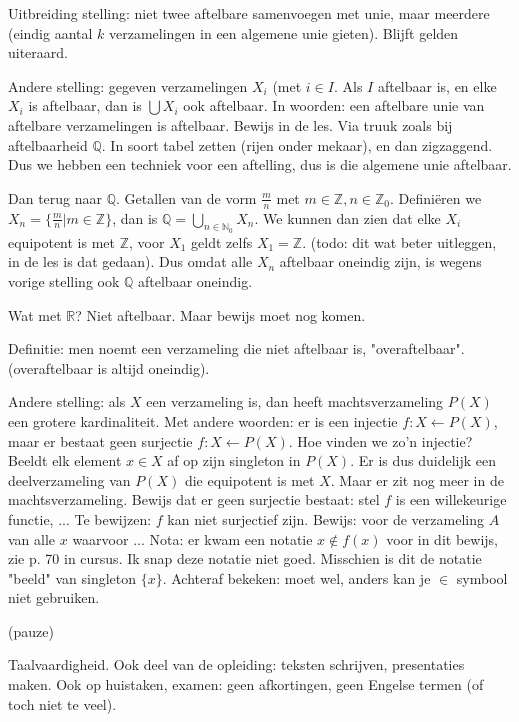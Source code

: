 \documentclass{article}
\begin{document}
Uitbreiding stelling: niet twee aftelbare samenvoegen met unie, maar meerdere (eindig aantal $k$ verzamelingen in een algemene unie gieten). Blijft gelden uiteraard. 

Andere stelling: gegeven verzamelingen $X_i$ (met $i \in I$. Als $I$ aftelbaar is, en elke $X_i$ is aftelbaar, dan is $\bigcup X_i$ ook aftelbaar. 
In woorden: een aftelbare unie van aftelbare verzamelingen is aftelbaar. 
Bewijs in de les. Via truuk zoals bij aftelbaarheid $\mathbb{Q}$. In soort tabel zetten (rijen onder mekaar), en dan zigzaggend. Dus we hebben een techniek voor een aftelling, dus is die algemene unie aftelbaar. 

Dan terug naar $\mathbb{Q}$. Getallen van de vorm $\frac{m}{n}$ met $m \in \mathbb{Z}, n \in \mathbb{Z}_0$. 
Defini\"eren we $X_n = \{  \frac{m}{n} | m \in  \mathbb{Z} \} $, 
dan is $\mathbb{Q} = \bigcup_{n \in \mathbb{N}_0} X_n$. 
We kunnen dan zien dat elke $X_i$ equipotent is met $\mathbb{Z}$, voor $X_1$ geldt zelfs $X_1 = \mathbb{Z}$. (todo: dit wat beter uitleggen, in de les is dat gedaan). Dus omdat alle $X_n$ aftelbaar oneindig zijn, is wegens vorige stelling ook $\mathbb{Q}$ aftelbaar oneindig. 

Wat met $\mathbb{R}$? Niet aftelbaar. Maar bewijs moet nog komen. 

Definitie: men noemt een verzameling die niet aftelbaar is, "overaftelbaar". (overaftelbaar is altijd oneindig). 

Andere stelling: als $X$ een verzameling is, dan heeft machtsverzameling $P(X)$ een grotere kardinaliteit. Met andere woorden: er is een injectie $f: X \leftarrow P(X)$, maar er bestaat geen surjectie $f: X \leftarrow P(X)$. 
Hoe vinden we zo'n injectie? Beeldt elk element $x \in X$ af op zijn singleton in $P(X)$. Er is dus duidelijk een deelverzameling van $P(X)$ die equipotent is met $X$. Maar er zit nog meer in de machtsverzameling. 
Bewijs dat er geen surjectie bestaat: stel $f$ is een willekeurige functie, ... Te bewijzen: $f$ kan niet surjectief zijn. Bewijs: voor de verzameling $A$ van alle $x$ waarvoor ... 
Nota: er kwam een notatie $x \notin f(x)$ voor in dit bewijs, zie p. 70 in cursus. Ik snap deze notatie niet goed. Misschien is dit de notatie "beeld" van singleton $\{x\}$. Achteraf bekeken: moet wel, anders kan je $\in$ symbool niet gebruiken. 

(pauze) 

Taalvaardigheid. Ook deel van de opleiding: teksten schrijven, presentaties maken. Ook op huistaken, examen: geen afkortingen, geen Engelse termen (of toch niet te veel). 
\end{document}
